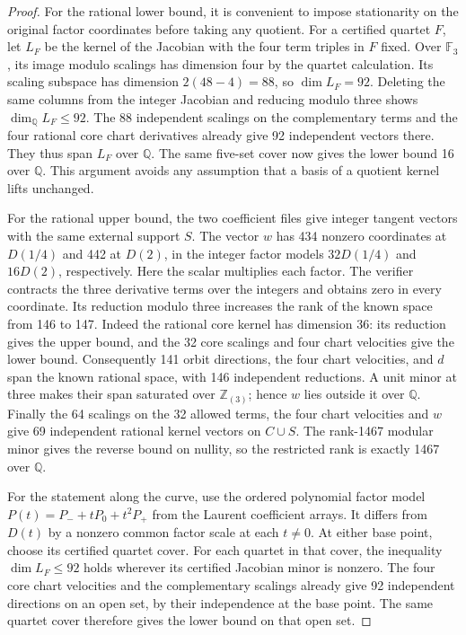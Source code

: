 \documentclass[11pt,reqno]{amsart}
\newcommand{\F}{\mathbb F}
\newcommand{\Q}{\mathbb Q}
\newcommand{\Z}{\mathbb Z}
\begin{document}
\begin{proof}
For the rational lower bound, it is convenient to impose stationarity on the original factor coordinates before taking any quotient. For a certified quartet \(F\), let \(L_F\) be the kernel of the Jacobian with the four term triples in \(F\) fixed. Over \(\F_3\), its image modulo scalings has dimension four by the quartet calculation. Its scaling subspace has dimension \(2(48-4)=88\), so \(\dim L_F=92\). Deleting the same columns from the integer Jacobian and reducing modulo three shows \(\dim_{\Q}L_F\le92\). The 88 independent scalings on the complementary terms and the four rational core chart derivatives already give 92 independent vectors there. They thus span \(L_F\) over \(\Q\). The same five-set cover now gives the lower bound 16 over \(\Q\). This argument avoids any assumption that a basis of a quotient kernel lifts unchanged.

For the rational upper bound, the two coefficient files give integer tangent vectors with the same external support \(S\). The vector \(w\) has 434 nonzero coordinates at \(D(1/4)\) and 442 at \(D(2)\), in the integer factor models \(32D(1/4)\) and \(16D(2)\), respectively. Here the scalar multiplies each factor. The verifier contracts the three derivative terms over the integers and obtains zero in every coordinate. Its reduction modulo three increases the rank of the known space from 146 to 147. Indeed the rational core kernel has dimension 36: its reduction gives the upper bound, and the 32 core scalings and four chart velocities give the lower bound. Consequently 141 orbit directions, the four chart velocities, and \(d\) span the known rational space, with 146 independent reductions. A unit minor at three makes their span saturated over \(\Z_{(3)}\); hence \(w\) lies outside it over \(\Q\). Finally the 64 scalings on the 32 allowed terms, the four chart velocities and \(w\) give 69 independent rational kernel vectors on \(C\cup S\). The rank-1467 modular minor gives the reverse bound on nullity, so the restricted rank is exactly 1467 over \(\Q\).

For the statement along the curve, use the ordered polynomial factor model \(P(t)=P_-+tP_0+t^2P_+\) from the Laurent coefficient arrays. It differs from \(D(t)\) by a nonzero common factor scale at each \(t\ne0\). At either base point, choose its certified quartet cover. For each quartet in that cover, the inequality \(\dim L_F\le92\) holds wherever its certified Jacobian minor is nonzero. The four core chart velocities and the complementary scalings already give 92 independent directions on an open set, by their independence at the base point. The same quartet cover therefore gives the lower bound on that open set.


\end{proof}
\end{document}
